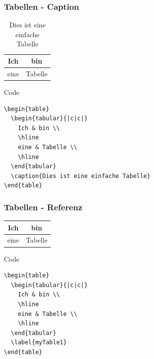 \begin{frame}[fragile]
  \frametitle{Tabellen - Caption}

  \begin{example}
    \begin{table}
      \begin{tabular}{|c|c|}
        Ich & bin \\
        \hline
        eine & Tabelle \\
        \hline
      \end{tabular}
      \caption{Dies ist eine einfache Tabelle}
    \end{table}
  \end{example}
  \pause
  \begin{block}{Code}
    \begin{verbatim}
\begin{table}
  \begin{tabular}{|c|c|}
    Ich & bin \\
    \hline
    eine & Tabelle \\
    \hline
  \end{tabular}
  \caption{Dies ist eine einfache Tabelle}
\end{table}
    \end{verbatim}
  \end{block}
\end{frame}
\begin{frame}[fragile]
  \frametitle{Tabellen - Referenz}

  \begin{example}
    \begin{table}
      \begin{tabular}{|c|c|}
        Ich & bin \\
        \hline
        eine & Tabelle \\
        \hline
      \end{tabular}
      \label{myTable1}
    \end{table}
  \end{example}
  \pause

  \begin{block}{Code}
    \begin{verbatim}
\begin{table}
  \begin{tabular}{|c|c|}
    Ich & bin \\
    \hline
    eine & Tabelle \\
    \hline
  \end{tabular}
  \label{myTable1}
\end{table}
    \end{verbatim}
  \end{block}
\end{frame}

